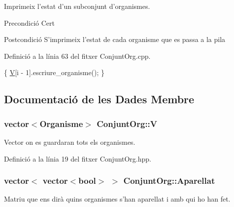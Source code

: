 Imprimeix l'estat d'un subconjunt d'organismes. 

\begin{DoxyPrecond}{Precondició}
Cert 
\end{DoxyPrecond}
\begin{DoxyPostcond}{Postcondició}
S'imprimeix l'estat de cada organisme que es passa a la pila 
\end{DoxyPostcond}


Definició a la línia 63 del fitxer Conjunt\-Org.\-cpp.


\begin{DoxyCode}
\{
    \hyperlink{class_conjunt_org_adab11e0ac8295072ec682716478a535a}{V}[i - 1].escriure\_organisme();
\}
\end{DoxyCode}


\subsection{Documentació de les Dades Membre}
\hypertarget{class_conjunt_org_adab11e0ac8295072ec682716478a535a}{
\subsubsection[{V}]{\setlength{\rightskip}{0pt plus 5cm}vector$<${\bf Organisme}$>$ Conjunt\-Org\-::\-V\hspace{0.3cm}{\ttfamily [private]}}}\label{class_conjunt_org_adab11e0ac8295072ec682716478a535a}


Vector on es guardaran tots els organismes. 



Definició a la línia 19 del fitxer Conjunt\-Org.\-hpp.

\hypertarget{class_conjunt_org_a9782fdb4c89e8dd61762453de8f77fcb}{
\subsubsection[{Aparellat}]{\setlength{\rightskip}{0pt plus 5cm}vector$<$ vector$<$bool$>$ $>$ Conjunt\-Org\-::\-Aparellat\hspace{0.3cm}{\ttfamily [private]}}}\label{class_conjunt_org_a9782fdb4c89e8dd61762453de8f77fcb}


Matriu que ens dirà quins organismes s'han aparellat i amb qui ho han fet. 




